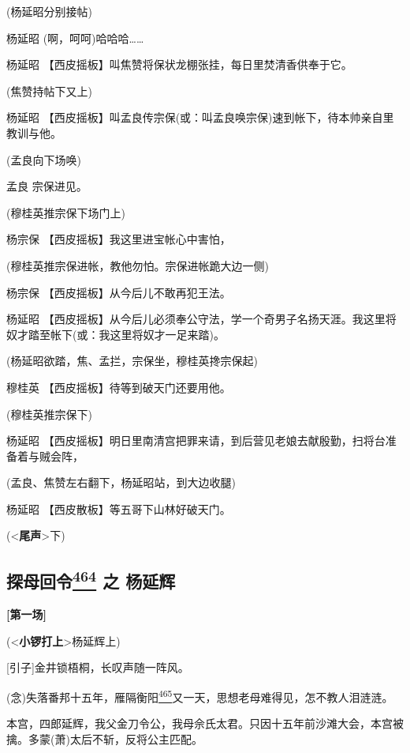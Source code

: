 (杨延昭分别接帖)

杨延昭 (啊，呵呵)哈哈哈\ldots{}\ldots{}

杨延昭 【西皮摇板】叫焦赞将保状龙棚张挂，每日里焚清香供奉于它。

(焦赞持帖下又上)

杨延昭
【西皮摇板】叫孟良传宗保(或：叫孟良唤宗保)速到帐下，待本帅亲自里教训与他。

(孟良向下场唤)

孟良 宗保进见。

(穆桂英推宗保下场门上)

杨宗保 【西皮摇板】我这里进宝帐心中害怕，

(穆桂英推宗保进帐，教他勿怕。宗保进帐跪大边一侧)

杨宗保 【西皮摇板】从今后儿不敢再犯王法。

杨延昭
【西皮摇板】从今后儿必须奉公守法，学一个奇男子名扬天涯。我这里将奴才踏至帐下(或：我这里将奴才一足来踏)。

(杨延昭欲踏，焦、孟拦，宗保坐，穆桂英搀宗保起)

穆桂英 【西皮摇板】待等到破天门还要用他。

(穆桂英推宗保下)

杨延昭
【西皮摇板】明日里南清宫把罪来请，到后营见老娘去献殷勤，扫将台准备着与贼会阵，

(孟良、焦赞左右翻下，杨延昭站，到大边收腿)

杨延昭 【西皮散板】等五哥下山林好破天门。

(\textless{}\textbf{尾声}\textgreater{}下)

\hypertarget{ux63a2ux6bcdux56deux4ee4-ux4e4b-ux6768ux5ef6ux8f89}{%
\subsection{\texorpdfstring{探母回令\protect\hyperlink{fn464}{\textsuperscript{464}}
之
杨延辉}{探母回令464 之 杨延辉}}\label{ux63a2ux6bcdux56deux4ee4-ux4e4b-ux6768ux5ef6ux8f89}}

\textbf{{[}第一场{]}}

(\textless{}\textbf{小锣打上}\textgreater{}杨延辉上)

{[}引子{]}金井锁梧桐，长叹声随一阵风。

(念)失落番邦十五年，雁隔衡阳\protect\hyperlink{fn465}{\textsuperscript{465}}又一天，思想老母难得见，怎不教人泪涟涟。

本宫，四郎延辉，我父金刀令公，我母佘氏太君。只因十五年前沙滩大会，本宫被擒。多蒙(萧)太后不斩，反将公主匹配。

